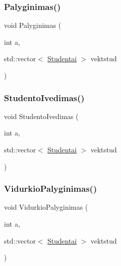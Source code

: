 \subsubsection{\texorpdfstring{Palyginimas()}{Palyginimas()}}
{\footnotesize\ttfamily void Palyginimas (\begin{DoxyParamCaption}\item[{int}]{a,  }\item[{std\+::vector$<$ \mbox{\hyperlink{class_studentai}{Studentai}} $>$}]{vektstud }\end{DoxyParamCaption})}

\mbox{\label{_komandos-_x_8cpp_a1fb40ae6d3463fe6cce823fd3261abe5}} 
\subsubsection{\texorpdfstring{StudentoIvedimas()}{StudentoIvedimas()}}
{\footnotesize\ttfamily void Studento\+Ivedimas (\begin{DoxyParamCaption}\item[{int}]{a,  }\item[{std\+::vector$<$ \mbox{\hyperlink{class_studentai}{Studentai}} $>$}]{vektstud }\end{DoxyParamCaption})}

\mbox{\label{_komandos-_x_8cpp_a0dfe7eb39e8dd9d8c83d866739c5c712}} 
\subsubsection{\texorpdfstring{VidurkioPalyginimas()}{VidurkioPalyginimas()}}
{\footnotesize\ttfamily void Vidurkio\+Palyginimas (\begin{DoxyParamCaption}\item[{int}]{a,  }\item[{std\+::vector$<$ \mbox{\hyperlink{class_studentai}{Studentai}} $>$}]{vektstud }\end{DoxyParamCaption})}

\mbox{\label{_komandos-_x_8cpp_a12fea27f5ccb0b6914f7fd90bc888be9}} 
